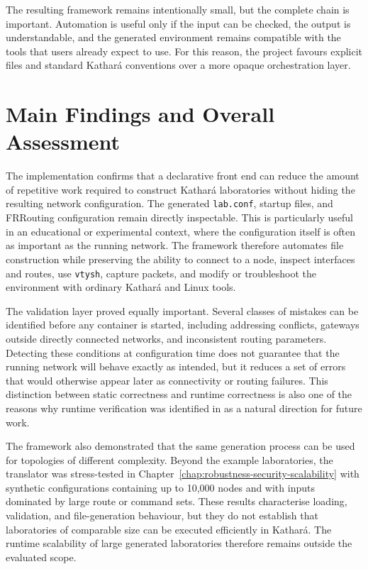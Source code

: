 The resulting framework remains intentionally small, but the complete chain is
important. Automation is useful only if the input can be checked, the output is
understandable, and the generated environment remains compatible with the tools
that users already expect to use. For this reason, the project favours explicit
files and standard Kathar\'a conventions over a more opaque orchestration layer.

\section{Main Findings and Overall Assessment}
\label{sec:conclusion-findings}

The implementation confirms that a declarative front end can reduce the amount
of repetitive work required to construct Kathar\'a laboratories without hiding
the resulting network configuration. The generated \texttt{lab.conf}, startup
files, and FRRouting configuration remain directly inspectable. This is
particularly useful in an educational or experimental context, where the
configuration itself is often as important as the running network. The
framework therefore automates file construction while preserving the ability to
connect to a node, inspect interfaces and routes, use \texttt{vtysh}, capture
packets, and modify or troubleshoot the environment with ordinary Kathar\'a and
Linux tools.

The validation layer proved equally important. Several classes of mistakes can
be identified before any container is started, including addressing conflicts,
gateways outside directly connected networks, and inconsistent routing
parameters. Detecting these conditions at configuration time does not guarantee
that the running network will behave exactly as intended, but it reduces a set
of errors that would otherwise appear later as connectivity or routing
failures. This distinction between static correctness and runtime correctness is
also one of the reasons why runtime verification was identified in
 as a natural direction for future work.

The framework also demonstrated that the same generation process can be used
for topologies of different complexity. Beyond the example laboratories, the
translator was stress-tested in Chapter~\ref{chap:robustness-security-scalability}
with synthetic configurations containing up to 10,000 nodes and with inputs
dominated by large route or command sets. These results characterise loading,
validation, and file-generation behaviour, but they do not establish that
laboratories of comparable size can be executed efficiently in Kathar\'a. The
runtime scalability of large generated laboratories therefore remains outside
the evaluated scope.

